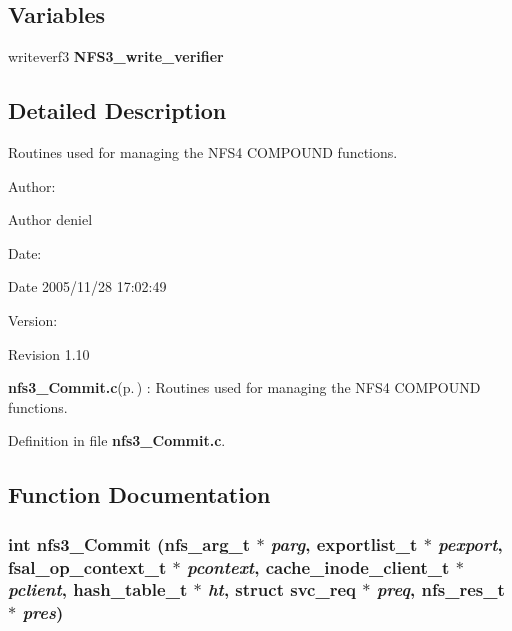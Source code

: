 \subsection*{Variables}
\begin{CompactItemize}
\item 
writeverf3 {\bf NFS3\_\-write\_\-verifier}
\end{CompactItemize}


\subsection{Detailed Description}
Routines used for managing the NFS4 COMPOUND functions. 

\begin{Desc}
\item[Author:]\begin{Desc}
\item[Author]deniel \end{Desc}
\end{Desc}
\begin{Desc}
\item[Date:]\begin{Desc}
\item[Date]2005/11/28 17:02:49 \end{Desc}
\end{Desc}
\begin{Desc}
\item[Version:]\begin{Desc}
\item[Revision]1.10 \end{Desc}
\end{Desc}
{\bf nfs3\_\-Commit.c}{\rm (p.\,\pageref{nfs3__Commit_8c})} : Routines used for managing the NFS4 COMPOUND functions.

Definition in file {\bf nfs3\_\-Commit.c}.

\subsection{Function Documentation}
\subsubsection{\setlength{\rightskip}{0pt plus 5cm}int nfs3\_\-Commit (nfs\_\-arg\_\-t $\ast$ {\em parg}, exportlist\_\-t $\ast$ {\em pexport}, fsal\_\-op\_\-context\_\-t $\ast$ {\em pcontext}, cache\_\-inode\_\-client\_\-t $\ast$ {\em pclient}, hash\_\-table\_\-t $\ast$ {\em ht}, struct svc\_\-req $\ast$ {\em preq}, nfs\_\-res\_\-t $\ast$ {\em pres})}\label{nfs3__Commit_8c_a1}




